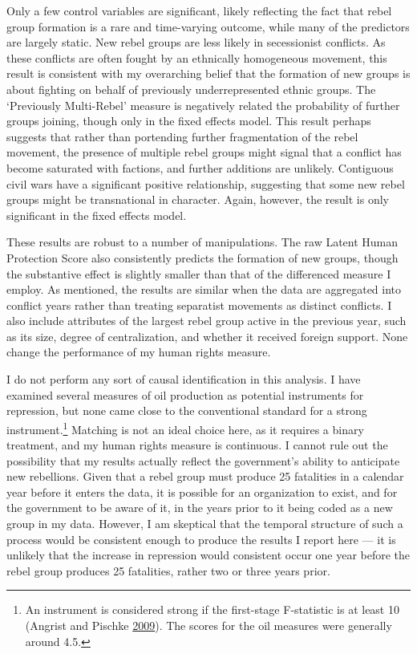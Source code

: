 \documentclass[12pt,]{book}
\let\rmarkdownfootnote\footnote%
\def\footnote{\protect\rmarkdownfootnote}
\theoremstyle{definition}
\theoremstyle{definition}
\theoremstyle{remark}
\begin{document}
Only a few control variables are significant, likely reflecting the fact
that rebel group formation is a rare and time-varying outcome, while
many of the predictors are largely static. New rebel groups are less
likely in secessionist conflicts. As these conflicts are often fought by
an ethnically homogeneous movement, this result is consistent with my
overarching belief that the formation of new groups is about fighting on
behalf of previously underrepresented ethnic groups. The `Previously
Multi-Rebel' measure is negatively related the probability of further
groups joining, though only in the fixed effects model. This result
perhaps suggests that rather than portending further fragmentation of
the rebel movement, the presence of multiple rebel groups might signal
that a conflict has become saturated with factions, and further
additions are unlikely. Contiguous civil wars have a significant
positive relationship, suggesting that some new rebel groups might be
transnational in character. Again, however, the result is only
significant in the fixed effects model.

These results are robust to a number of manipulations. The raw Latent
Human Protection Score also consistently predicts the formation of new
groups, though the substantive effect is slightly smaller than that of
the differenced measure I employ. As mentioned, the results are similar
when the data are aggregated into conflict years rather than treating
separatist movements as distinct conflicts. I also include attributes of
the largest rebel group active in the previous year, such as its size,
degree of centralization, and whether it received foreign support. None
change the performance of my human rights measure.

I do not perform any sort of causal identification in this analysis. I
have examined several measures of oil production as potential
instruments for repression, but none came close to the conventional
standard for a strong instrument.\footnote{An instrument is considered
  strong if the first-stage F-statistic is at least 10 (Angrist and
  Pischke \protect\hyperlink{ref-Angrist2009}{2009}). The scores for the
  oil measures were generally around 4.5.} Matching is not an ideal
choice here, as it requires a binary treatment, and my human rights
measure is continuous. I cannot rule out the possibility that my results
actually reflect the government's ability to anticipate new rebellions.
Given that a rebel group must produce 25 fatalities in a calendar year
before it enters the data, it is possible for an organization to exist,
and for the government to be aware of it, in the years prior to it being
coded as a new group in my data. However, I am skeptical that the
temporal structure of such a process would be consistent enough to
produce the results I report here --- it is unlikely that the increase
in repression would consistent occur one year before the rebel group
produces 25 fatalities, rather two or three years prior.
\end{document}
